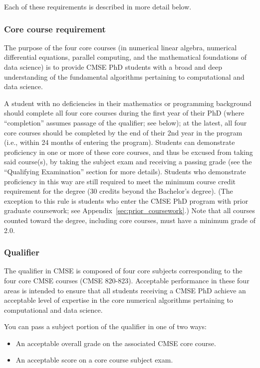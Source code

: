 Each of these requirements is described in more detail below.

\vspace{3mm}
\subsubsection{Core course requirement}
\label{sec:core_courses}

The purpose of the four core courses (in numerical linear algebra,
numerical differential equations, parallel computing, and the
mathematical foundations of data science) is to provide CMSE PhD
students with a broad and deep understanding of the fundamental
algorithms pertaining to computational and data science.

A student with no deficiencies in their mathematics or programming
background should complete all four core courses during the first year
of their PhD (where ``completion'' assumes passage of the qualifier;
see below); at the latest, all four core courses should be completed
by the end of their 2nd year in the program (i.e., within 24 months of
entering the program).  Students can demonstrate proficiency in
one or more of these core courses, and thus be excused from taking
said course(s), by taking the subject exam and receiving a passing
grade (see the ``Qualifying Examination'' section for more details).
Students who demonstrate proficiency in this way are still required to
meet the minimum course credit requirement for the degree (30 credits
beyond the Bachelor's degree).  (The exception to this rule is
students who enter the CMSE PhD program with prior graduate
coursework; see Appendix~\ref{sec:prior_coursework}.)  Note that all courses
counted toward the degree, including core courses, must
have a minimum grade of 2.0.

\vspace{3mm}
\subsubsection{Qualifier}
\label{sec:qual_exam}

The qualifier in CMSE is composed of four core subjects corresponding
to the four core CMSE courses (CMSE 820-823). Acceptable performance
in these four areas is intended to ensure that all students receiving a
CMSE PhD achieve an acceptable level of expertise in the core
numerical algorithms pertaining to computational and data science.

You can pass a subject portion of the qualifier in one of
two ways:
\begin{itemize}
\item An acceptable overall grade on the associated CMSE core course.
\item An acceptable score on a core course subject exam.
\end{itemize}

